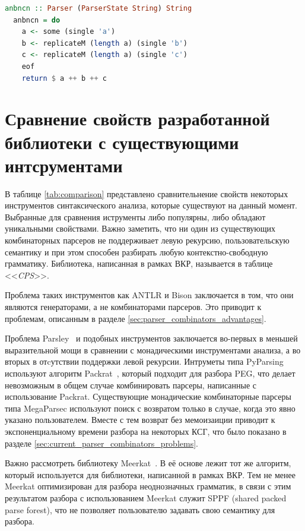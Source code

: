 \documentclass[times]{itmo-student-thesis}
\begin{document}
\begin{lstlisting}[language=Haskell,float=!h,caption={Парсер $a^kb^kc^k$},label={lst:anbncn_parser}]
  anbncn :: Parser (ParserState String) String
  anbncn = do
    a <- some (single 'a')
    b <- replicateM (length a) (single 'b')
    c <- replicateM (length a) (single 'c')
    eof
    return $ a ++ b ++ c
\end{lstlisting}

\section{Сравнение свойств разработанной библиотеки с существующими интсрументами}\label{sec:comparison_table}

В таблице \ref{tab:comparison} представлено сравнительнение свойств некоторых инструментов синтаксического анализа,
которые существуют на данный момент. Выбранные для сравнения иструменты либо популярны, либо обладают уникальными
свойствами. Важно заметить, что ни один из существующих комбинаторных парсеров не поддерживает левую рекурсию,
пользовательскую семантику и при этом способен разбирать любую контекстно-свободную грамматику. Библиотека, написанная в 
рамках ВКР, называется в таблице <<\textit{CPS}>>.

Проблема таких инструментов как ANTLR и Bison заключается в том, что они являются генераторами, а не комбинаторами парсеров.
Это приводит к проблемам, описанным в разделе \ref{sec:parser_combinators_advantages}. 

Проблема Parsley~\cite{willis_staged_2020} и подобных инструментов заключается во-первых в меньшей выразительной мощи в
сравнении с монадическими инструментами анализа, а во вторых в отcутствии поддержки левой рекурсии.
Интруметы типа PyParsing используют алгоритм Packrat~\cite{ford_parsing_2004}, который подходит для разбора PEG, что
делает невозможным в общем случае комбинировать парсеры, написанные с использование Packrat.
Существующие монадические комбинаторные парсеры типа MegaParsec используют поиск с возвратом только в случае, когда это явно
указано пользователем. Вместе с тем возврат без мемоизаиции приводит к экспоненциальному времени разбора на некоторых КСГ, 
что было показано в разделе \ref{sec:current_parser_combinators_problems}.

Важно рассмотреть библиотеку Meerkat~\cite{johnson_memoization_1995}. В её основе лежит тот же алгоритм, который используется для
библиотеки, написанной	в рамках ВКР. Тем не менее Meerkat оптимизирован для разбора неоднозначных грамматик, в связи с
этим результатом разбора с использованием Meerkat служит SPPF (shared packed parse forest), что не позволяет пользователю
задавать свою семантику для разбора.
\end{document}

